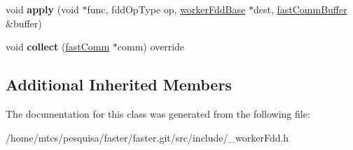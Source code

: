 \begin{DoxyCompactItemize}
\item 
\hypertarget{classfaster_1_1__workerFdd_3_01T_01_5_01_4_a249018ae1fe5990f9b081c8519fccf13}{}void {\bfseries apply} (void $\ast$func, fdd\+Op\+Type op, \hyperlink{classfaster_1_1workerFddBase}{worker\+Fdd\+Base} $\ast$dest, \hyperlink{classfaster_1_1fastCommBuffer}{fast\+Comm\+Buffer} \&buffer)\label{classfaster_1_1__workerFdd_3_01T_01_5_01_4_a249018ae1fe5990f9b081c8519fccf13}

\item 
\hypertarget{classfaster_1_1__workerFdd_3_01T_01_5_01_4_a3548e79c7a505468d842a6bb49e392f3}{}void {\bfseries collect} (\hyperlink{classfaster_1_1fastComm}{fast\+Comm} $\ast$comm) override\label{classfaster_1_1__workerFdd_3_01T_01_5_01_4_a3548e79c7a505468d842a6bb49e392f3}

\end{DoxyCompactItemize}
\subsection*{Additional Inherited Members}


The documentation for this class was generated from the following file\+:\begin{DoxyCompactItemize}
\item 
/home/mtcs/pesquisa/faster/faster.\+git/src/include/\+\_\+worker\+Fdd.\+h\end{DoxyCompactItemize}
